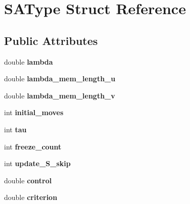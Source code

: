 \hypertarget{structSAType}{
\section{SAType Struct Reference}
\label{structSAType}
}
\subsection*{Public Attributes}
\begin{DoxyCompactItemize}
\item 
\hypertarget{structSAType_a6371d2104aced61038502addcd2cdcde}{
double {\bfseries lambda}}
\label{structSAType_a6371d2104aced61038502addcd2cdcde}

\item 
\hypertarget{structSAType_a9599893349a0e159150e9922b9b06bfe}{
double {\bfseries lambda\_\-mem\_\-length\_\-u}}
\label{structSAType_a9599893349a0e159150e9922b9b06bfe}

\item 
\hypertarget{structSAType_a30572a85cb5f4f9569dcfd09b4fd7800}{
double {\bfseries lambda\_\-mem\_\-length\_\-v}}
\label{structSAType_a30572a85cb5f4f9569dcfd09b4fd7800}

\item 
\hypertarget{structSAType_af01b0444581ed288401c0fe63f91dc7d}{
int {\bfseries initial\_\-moves}}
\label{structSAType_af01b0444581ed288401c0fe63f91dc7d}

\item 
\hypertarget{structSAType_a3ba4c8887743bf983970464e4b6fb577}{
int {\bfseries tau}}
\label{structSAType_a3ba4c8887743bf983970464e4b6fb577}

\item 
\hypertarget{structSAType_a58704cbe895e1eb33c92514f74a998be}{
int {\bfseries freeze\_\-count}}
\label{structSAType_a58704cbe895e1eb33c92514f74a998be}

\item 
\hypertarget{structSAType_acea3ff6d1228f43c1dcb073bdec22e60}{
int {\bfseries update\_\-S\_\-skip}}
\label{structSAType_acea3ff6d1228f43c1dcb073bdec22e60}

\item 
\hypertarget{structSAType_aa7efa19efdb5a6e965efa709fc0bc7e8}{
double {\bfseries control}}
\label{structSAType_aa7efa19efdb5a6e965efa709fc0bc7e8}

\item 
\hypertarget{structSAType_a1f936ca80311aa7f2339f7d5b7583d21}{
double {\bfseries criterion}}
\label{structSAType_a1f936ca80311aa7f2339f7d5b7583d21}


\end{DoxyCompactItemize}
